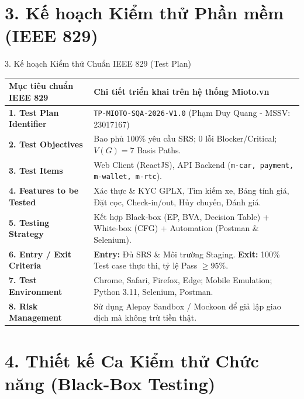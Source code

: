\documentclass[aspectratio=169,10pt]{beamer}
\begin{document}
\section{3. Kế hoạch Kiểm thử Phần mềm (IEEE 829)}

\begin{frame}{3. Kế hoạch Kiểm thử Chuẩn IEEE 829 (Test Plan)}
  \begin{table}[ht]
    \centering\footnotesize
    \begin{tabularx}{\textwidth}{lX}
      \toprule
      \textbf{Mục tiêu chuẩn IEEE 829} & \textbf{Chi tiết triển khai trên hệ thống Mioto.vn} \\
      \midrule
      \textbf{1. Test Plan Identifier} & \texttt{TP-MIOTO-SQA-2026-V1.0} (Phạm Duy Quang - MSSV: 23017167) \\
      \textbf{2. Test Objectives} & Bao phủ 100\% yêu cầu SRS; 0 lỗi Blocker/Critical; $V(G)=7$ Basis Paths. \\
      \textbf{3. Test Items} & Web Client (ReactJS), API Backend (\texttt{m-car, payment, m-wallet, m-rtc}). \\
      \textbf{4. Features to be Tested} & Xác thực \& KYC GPLX, Tìm kiếm xe, Bảng tính giá, Đặt cọc, Check-in/out, Hủy chuyến, Đánh giá. \\
      \textbf{5. Testing Strategy} & Kết hợp Black-box (EP, BVA, Decision Table) + White-box (CFG) + Automation (Postman \& Selenium). \\
      \textbf{6. Entry / Exit Criteria} & \textbf{Entry:} Đủ SRS \& Môi trường Staging. \textbf{Exit:} 100\% Test case thực thi, tỷ lệ Pass $\ge 95\%$. \\
      \textbf{7. Test Environment} & Chrome, Safari, Firefox, Edge; Mobile Emulation; Python 3.11, Selenium, Postman. \\
      \textbf{8. Risk Management} & Sử dụng Alepay Sandbox / Mockoon để giả lập giao dịch mà không trừ tiền thật. \\
      \bottomrule
    \end{tabularx}
  \end{table}
\end{frame}

\section{4. Thiết kế Ca Kiểm thử Chức năng (Black-Box Testing)}
\end{document}
